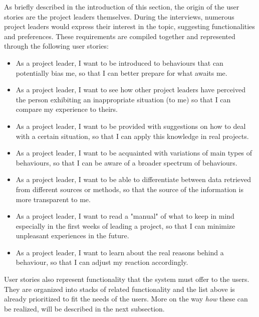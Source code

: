 As briefly described in the introduction of this section, the origin of the user stories are the project leaders themselves. During the interviews, numerous project leaders would express their interest in the topic, suggesting functionalities and preferences. These requirements are compiled together and represented through the following user stories:

\begin{itemize}
\item As a project leader, I want to be introduced to behaviours that can potentially bias me, so that I can better prepare for what awaits me.

\item As a project leader, I want to see how other project leaders have perceived the person exhibiting an inappropriate situation (to me) so that I can compare my experience to theirs.

\item As a project leader, I want to be provided with suggestions on how to deal with a certain situation, so that I can apply this knowledge in real projects.

\item As a project leader, I want to be acquainted with variations of main types of behaviours, so that I can be aware of a broader spectrum of behaviours.

\item As a project leader, I want to be able to differentiate between data retrieved from different sources or methods, so that the source of the information is more transparent to me. 

\item As a project leader, I want to read a "manual" of what to keep in mind especially in the first weeks of leading a project, so that I can minimize unpleasant experiences in the future.

\item As a project leader, I want to learn about the real reasons behind a behaviour, so that I can adjust my reaction accordingly. 

\end{itemize}

User stories also represent functionality that the system must offer to the users.  They are organized into stacks of related functionality and the list above is already prioritized to fit the needs of the users. More on the way \textit{how} these can be realized, will be described in the next subsection. 

